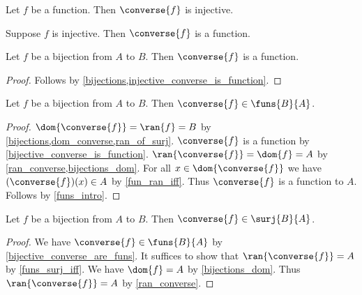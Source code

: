 \begin{proposition}\label{converse_of_function_is_injective}
    Let $f$ be a function.
    Then $\converse{f}$ is injective. %
\end{proposition}

\begin{proposition}\label{injective_converse_is_function}
    Suppose $f$ is injective. %
    Then $\converse{f}$ is a function.
\end{proposition}

\begin{proposition}\label{bijective_converse_is_function}
    Let $f$ be a bijection from $A$ to $B$.
    Then $\converse{f}$ is a function.
\end{proposition}
\begin{proof}
    Follows by \cref{bijections,injective_converse_is_function}.
\end{proof}

\begin{proposition}\label{bijective_converse_are_funs}
    Let $f$ be a bijection from $A$ to $B$.
    Then $\converse{f}\in\funs{B}{A}$.
\end{proposition}
\begin{proof}
    $\dom{\converse{f}} = \ran{f} = B$ by \cref{bijections,dom_converse,ran_of_surj}.
    $\converse{f}$ is a function by \cref{bijective_converse_is_function}.
    $\ran{\converse{f}}=\dom{f}=A$ by \cref{ran_converse,bijections_dom}.
    For all $x\in\dom{\converse{f}}$ we have $(\converse{f})(x)\in A$
        by \cref{fun_ran_iff}.
    Thus $\converse{f}$ is a function to $A$.
    Follows by \cref{funs_intro}.
\end{proof}

\begin{proposition}\label{bijective_converse_are_surjs}
    Let $f$ be a bijection from $A$ to $B$.
    Then $\converse{f}\in\surj{B}{A}$.
\end{proposition}
\begin{proof}
    We have $\converse{f}\in\funs{B}{A}$ by \cref{bijective_converse_are_funs}.
    It suffices to show that $\ran{\converse{f}} = A$ by \cref{funs_surj_iff}.
    We have $\dom{f} = A$ by \cref{bijections_dom}.
    Thus $\ran{\converse{f}} = A$ by \cref{ran_converse}.
\end{proof}


